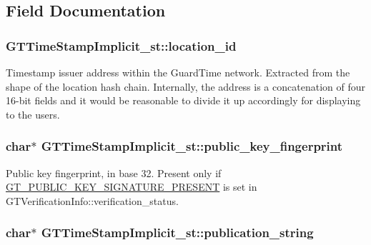 \subsection{Field Documentation}
\hypertarget{struct_g_t_time_stamp_implicit__st_a273697a4a7153e06a17c9e501742e284}{
\subsubsection[{location\_\-id}]{ {\bf GTTimeStampImplicit\_\-st::location\_\-id}}}
\label{struct_g_t_time_stamp_implicit__st_a273697a4a7153e06a17c9e501742e284}
Timestamp issuer address within the GuardTime network. Extracted from the shape of the location hash chain. Internally, the address is a concatenation of four 16-\/bit fields and it would be reasonable to divide it up accordingly for displaying to the users. \hypertarget{struct_g_t_time_stamp_implicit__st_af7c3030365e19743b105892ded2b1060}{
\subsubsection[{public\_\-key\_\-fingerprint}]{\setlength{\rightskip}{0pt plus 5cm}char$\ast$ {\bf GTTimeStampImplicit\_\-st::public\_\-key\_\-fingerprint}}}
\label{struct_g_t_time_stamp_implicit__st_af7c3030365e19743b105892ded2b1060}
Public key fingerprint, in base 32. Present only if \hyperlink{group__verification_ggae269a951c7facac91b31ab799f9595d0a7df57423a1d5add755fdb4c284a600ef}{GT\_\-PUBLIC\_\-KEY\_\-SIGNATURE\_\-PRESENT} is set in GTVerificationInfo::verification\_\-status. \hypertarget{struct_g_t_time_stamp_implicit__st_a06dd47a8c94b77efe8136e81f1ca5674}{
\subsubsection[{publication\_\-string}]{\setlength{\rightskip}{0pt plus 5cm}char$\ast$ {\bf GTTimeStampImplicit\_\-st::publication\_\-string}}}

